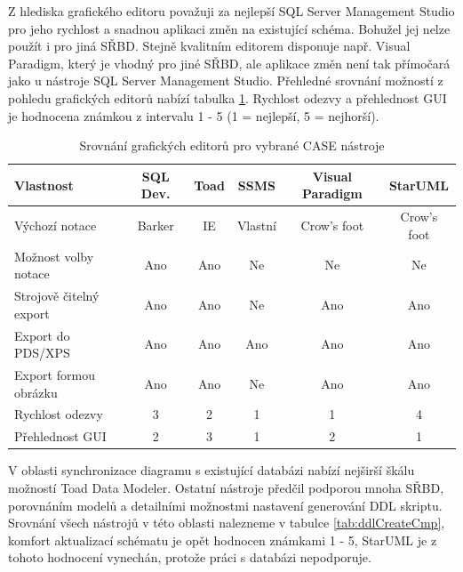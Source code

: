 \documentclass[czech,bachelor,public,dept460,male,oneside]{diploma}
\begin{document}
	Z hlediska grafického editoru považuji za nejlepší SQL Server Management Studio pro jeho rychlost a snadnou aplikaci změn na existující schéma. Bohužel jej nelze použít i pro jiná SŘBD. Stejně kvalitním editorem disponuje např. Visual Paradigm, který je vhodný pro jiné SŘBD, ale aplikace změn není tak přímočará jako u nástroje SQL Server Management Studio. Přehledné srovnání možností z pohledu grafických editorů nabízí tabulka \ref{tab:geditCmp}. Rychlost odezvy a přehlednost GUI je hodnocena známkou z intervalu 1 - 5 (1 = nejlepší, 5 = nejhorší).
	
	\begin{table}[h!]
		\centering
		\caption{Srovnání grafických editorů pro vybrané CASE nástroje}
		\label{tab:geditCmp}
		\begin{tabular}{l c c c c c}
			\toprule
			Vlastnost & SQL Dev. & Toad & SSMS & Visual Paradigm & StarUML \\
			\midrule
			Výchozí notace & Barker & IE & Vlastní & Crow's foot & Crow's foot \\
			Možnost volby notace & Ano & Ano & Ne & Ne & Ne \\
			Strojově čitelný export & Ano & Ano & Ne & Ano & Ano \\
			Export do PDS/XPS & Ano & Ano & Ano & Ano & Ano \\
			Export formou obrázku & Ano & Ano & Ne & Ano & Ano \\
			Rychlost odezvy & 3 & 2 & 1 & 1 & 4 \\
			Přehlednost GUI & 2 & 3 & 1 & 2 & 1 \\
			\midrule
		\end{tabular}
	\end{table}
	
	\newpage
	V oblasti synchronizace diagramu s existující databázi nabízí nejširší škálu možností Toad Data Modeler. Ostatní nástroje předčil podporou mnoha SŘBD, porovnáním modelů a detailními možnostmi nastavení generování DDL skriptu. Srovnání všech nástrojů v této oblasti nalezneme v tabulce \ref{tab:ddlCreateCmp}, komfort aktualizací schématu je opět hodnocen známkami 1 - 5, StarUML je z tohoto hodnocení vynechán, protože práci s databázi nepodporuje.
	
\end{document}
